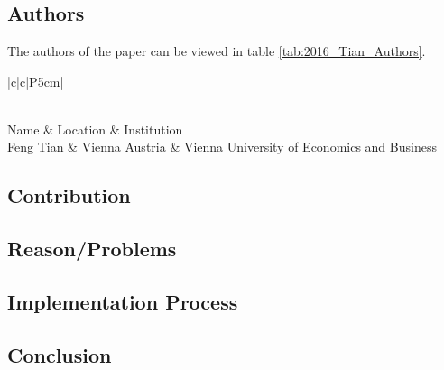 \clearpage
\section*{\citet{2016_Tian}}

\subsection*{Authors}
The authors of the paper can be viewed in table \ref{tab:2016_Tian_Authors}.
\begin{longtable}{ |c|c|P{5cm}| }
	\caption{Authors} \label{tab:2016_Tian_Authors} \\
	\hline
 	Name & Location & Institution \\ [0.5ex] 
 	\hline\hline
 	\endhead
 	Feng Tian & Vienna Austria  & Vienna University of Economics and Business \\
	 \hline
\end{longtable}


\subsection*{Contribution}



\subsection*{Reason/Problems}



\subsection*{Implementation Process}


\subsection*{Conclusion}


